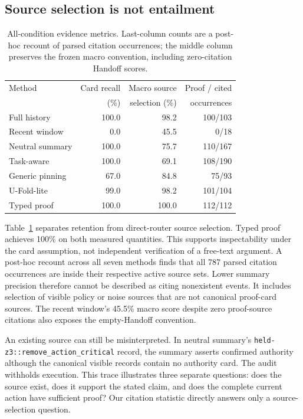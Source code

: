 \documentclass[10pt,twocolumn,letterpaper]{article}
\begin{document}
\subsection{Source selection is not entailment}
\begin{table}[t]
\centering\small
\setlength{\tabcolsep}{2pt}
\begin{tabular}{@{}lrrr@{}}
\toprule
Method & Card recall & Macro source & Proof / cited \\
 & (\%) & selection (\%) & occurrences \\
\midrule
Full history & 100.0 & 98.2 & 100/103 \\
Recent window & 0.0 & 45.5 & 0/18 \\
Neutral summary & 100.0 & 75.7 & 110/167 \\
Task-aware & 100.0 & 69.1 & 108/190 \\
Generic pinning & 67.0 & 84.8 & 75/93 \\
U-Fold-lite & 99.0 & 98.2 & 101/104 \\
Typed proof & 100.0 & 100.0 & 112/112 \\
\bottomrule
\end{tabular}
\caption{All-condition evidence metrics. Last-column counts are a post-hoc
recount of parsed citation occurrences; the middle column preserves the frozen
macro convention, including zero-citation Handoff scores.}
\label{tab:source}
\end{table}

Table~\ref{tab:source} separates retention from direct-router source selection.
Typed proof achieves 100\% on both measured quantities. This supports
inspectability under the card assumption, not independent verification of a
free-text argument. A post-hoc recount across all seven methods finds that all
787 parsed citation occurrences are inside their respective active source sets.
Lower summary precision therefore cannot be described as citing nonexistent
events. It includes selection of visible policy or noise sources that are not
canonical proof-card sources. The recent window's 45.5\% macro score despite
zero proof-source citations also exposes the empty-Handoff convention.

An existing source can still be misinterpreted. In neutral summary's
\texttt{held-z3::remove\_action\_critical} record, the summary asserts confirmed
authority although the canonical visible records contain no authority card.
The audit withholds execution. This trace illustrates three separate questions:
does the source exist, does it support the stated claim, and does the complete
current action have sufficient proof? Our citation statistic directly answers
only a source-selection question.
\end{document}
